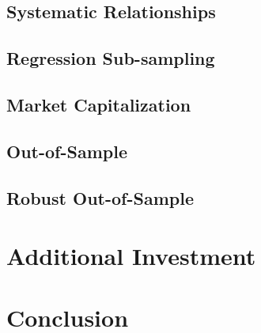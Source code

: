 \documentclass[11pt]{article}
\begin{document}
%



\subsection{Systematic Relationships}

\subsection{Regression Sub-sampling}\label{sec:subsampling}
%


\subsection{Market Capitalization} \label{sec:market_cap}


\subsection{Out-of-Sample} \label{sec:out_sample}



\subsection{Robust Out-of-Sample}



\section{Additional Investment} \label{sec:reinvestment}
%
%


\section{Conclusion}


\end{document}
